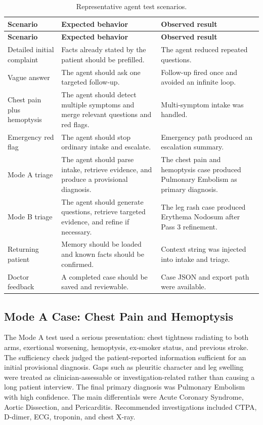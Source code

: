 \begin{longtable}{p{} p{} p{}}
\caption{Representative agent test scenarios.}
\label{tab:agent_tests}\\
\toprule
\textbf{Scenario} & \textbf{Expected behavior} & \textbf{Observed result}\\
\midrule
\endfirsthead
\toprule
\textbf{Scenario} & \textbf{Expected behavior} & \textbf{Observed result}\\
\midrule
\endhead
Detailed initial complaint & Facts already stated by the patient should be prefilled. & The agent reduced repeated questions.\\
Vague answer & The agent should ask one targeted follow-up. & Follow-up fired once and avoided an infinite loop.\\
Chest pain plus hemoptysis & The agent should detect multiple symptoms and merge relevant questions and red flags. & Multi-symptom intake was handled.\\
Emergency red flag & The agent should stop ordinary intake and escalate. & Emergency path produced an escalation summary.\\
Mode A triage & The agent should parse intake, retrieve evidence, and produce a provisional diagnosis. & The chest pain and hemoptysis case produced Pulmonary Embolism as primary diagnosis.\\
Mode B triage & The agent should generate questions, retrieve targeted evidence, and refine if necessary. & The leg rash case produced Erythema Nodosum after Pass 3 refinement.\\
Returning patient & Memory should be loaded and known facts should be confirmed. & Context string was injected into intake and triage.\\
Doctor feedback & A completed case should be saved and reviewable. & Case JSON and export path were available.\\
\bottomrule
\end{longtable}

\subsection{Mode A Case: Chest Pain and Hemoptysis}

The Mode A test used a serious presentation: chest tightness radiating to both arms, exertional worsening, hemoptysis, ex-smoker status, and previous stroke. The sufficiency check judged the patient-reported information sufficient for an initial provisional diagnosis. Gaps such as pleuritic character and leg swelling were treated as clinician-assessable or investigation-related rather than causing a long patient interview. The final primary diagnosis was Pulmonary Embolism with high confidence. The main differentials were Acute Coronary Syndrome, Aortic Dissection, and Pericarditis. Recommended investigations included CTPA, D-dimer, ECG, troponin, and chest X-ray.

